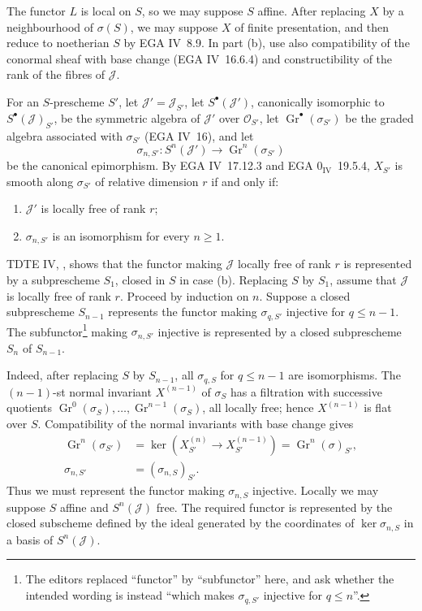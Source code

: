 The functor \(L\) is local on \(S\), so we may suppose \(S\) affine.
After replacing \(X\) by a neighbourhood of \(\sigma(S)\), we may
suppose \(X\) of finite presentation, and then reduce to noetherian
\(S\) by EGA IV~8.9. In part (b), use also compatibility of the
conormal sheaf with base change (EGA IV~16.6.4) and constructibility
of the rank of the fibres of \(\mathcal J\).

For an \(S\)-prescheme \(S'\), let
\(\mathcal J'=\mathcal J_{S'}\), let
\(S^\bullet(\mathcal J')\), canonically isomorphic to
\(S^\bullet(\mathcal J)_{S'}\), be the symmetric algebra of
\(\mathcal J'\) over \(\mathcal O_{S'}\), let
\(\operatorname{Gr}^\bullet(\sigma_{S'})\) be the graded algebra
associated with \(\sigma_{S'}\) (EGA IV~16), and let
\[
 \sigma_{n,S'}:S^n(\mathcal J')
 \longrightarrow\operatorname{Gr}^n(\sigma_{S'})
\]
be the canonical epimorphism. By EGA IV~17.12.3 and
EGA \(0_{\mathrm{IV}}\)~19.5.4, \(X_{S'}\) is smooth along
\(\sigma_{S'}\) of relative dimension \(r\) if and only if:
\begin{enumerate}
\renewcommand{\labelenumi}{\textup{\roman{enumi})}}
\item \(\mathcal J'\) is locally free of rank \(r\);
\item \(\sigma_{n,S'}\) is an isomorphism for every \(n\geq1\).
\end{enumerate}

TDTE IV, , shows that the functor making \(\mathcal J\)
locally free of rank \(r\) is represented by a subprescheme \(S_1\),
closed in \(S\) in case (b). Replacing \(S\) by \(S_1\), assume that
\(\mathcal J\) is locally free of rank \(r\). Proceed by induction on
\(n\). Suppose a closed subprescheme \(S_{n-1}\) represents the
functor making \(\sigma_{q,S'}\) injective for \(q\leq n-1\).
The subfunctor\footnote{The editors replaced ``functor'' by
``subfunctor'' here, and ask whether the intended wording is instead
``which makes \(\sigma_{q,S'}\) injective for \(q\leq n\)''.}
making \(\sigma_{n,S'}\) injective is represented by a closed
subprescheme \(S_n\) of \(S_{n-1}\).

Indeed, after replacing \(S\) by \(S_{n-1}\), all
\(\sigma_{q,S}\) for \(q\leq n-1\) are isomorphisms. The
\((n-1)\)-st normal invariant \(X^{(n-1)}\) of \(\sigma_S\) has a
filtration with successive quotients
 \(\operatorname{Gr}^0(\sigma_S),\ldots,
 \operatorname{Gr}^{n-1}(\sigma_S)\), all locally free; hence
\(X^{(n-1)}\) is flat over \(S\). Compatibility of the normal
invariants with base change gives
\[
\begin{aligned}
\operatorname{Gr}^n(\sigma_{S'})
 &=\ker\!\left(X_{S'}^{(n)}\to X_{S'}^{(n-1)}\right)
  =\operatorname{Gr}^n(\sigma)_{S'},\\
\sigma_{n,S'}&=(\sigma_{n,S})_{S'}.
\end{aligned}
\]
Thus we must represent the functor making \(\sigma_{n,S}\) injective.
Locally we may suppose \(S\) affine and \(S^n(\mathcal J)\) free.
The required functor is represented by the closed subscheme defined
by the ideal generated by the coordinates of
\(\ker\sigma_{n,S}\) in a basis of \(S^n(\mathcal J)\).

